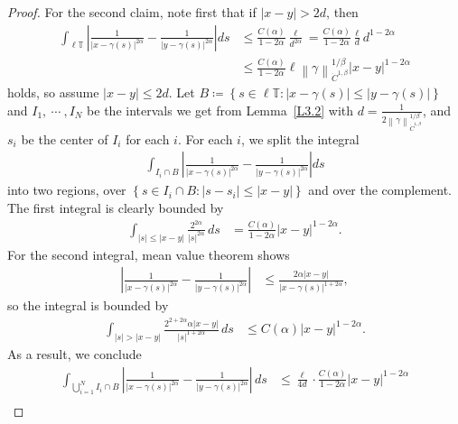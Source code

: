 \documentclass[reqno,centertags,12pt]{amsart}
\theoremstyle{definition}
\numberwithin{equation}{section}
\newcommand{\abs}[1]{\left\lvert#1\right\rvert}
\newcommand{\norm}[1]{\left\|#1\right\|}
\newcommand{\setbc}[2]{\left\{ #1\colon#2 \right\}}
\newcommand{\bbT}{{\mathbb{T}}}
\begin{document}
\begin{proof}
    For the second claim, note first that if $\abs{x - y} > 2d$, then
    \begin{align*}
        \int_{\ell\bbT}\abs{\frac{1}{\abs{x - \gamma(s)}^{2\alpha}}
        - \frac{1}{\abs{y - \gamma(s)}^{2\alpha}}}ds
        &\leq \frac{C(\alpha)}{1-2\alpha}\frac{\ell}{d^{2\alpha}}
        = \frac{C(\alpha)}{1 - 2\alpha}\frac{\ell}{d}d^{1-2\alpha} \\
        &\leq \frac{C(\alpha)}{1-2\alpha}
        \ell\norm{\gamma}_{\dot{C}^{1,\beta}}^{1/\beta}\abs{x-y}^{1-2\alpha}
    \end{align*}
    holds, so assume $\abs{x - y} \leq 2d$.
    Let $B\coloneqq\setbc{s\in\ell\bbT}{\abs{x - \gamma(s)}\leq\abs{y - \gamma(s)}}$ and
    $I_{1},\ \cdots\ ,I_{N}$ be the intervals we get from
    Lemma~\ref{L3.2} with
    $d = \frac{1}{2\norm{\gamma}_{\dot{C}^{1,\beta}}^{1/\beta}}$,
    and $s_{i}$ be the center of $I_{i}$ for each $i$. For each $i$, we split the integral
    \begin{align*}
        \int_{I_{i}\cap B}\abs{
            \frac{1}{\abs{x - \gamma(s)}^{2\alpha}}
            - \frac{1}{\abs{y - \gamma(s)}^{2\alpha}}
        }ds
    \end{align*}
    into two regions, over $\setbc{s\in I_{i}\cap B}{\abs{s - s_{i}}\leq \abs{x-y}}$
    and over the complement. The first integral is clearly bounded by
    \begin{align*}
        \int_{\abs{s}\leq\abs{x - y}}\frac{2^{2\alpha}}{\abs{s}^{2\alpha}}\,ds
        &= \frac{C(\alpha)}{1-2\alpha}\abs{x-y}^{1-2\alpha}.
    \end{align*}
    For the second integral, mean value theorem shows
    \begin{align*}
        \abs{
            \frac{1}{\abs{x - \gamma(s)}^{2\alpha}}
            - \frac{1}{\abs{y - \gamma(s)}^{2\alpha}}
        }
        &\leq \frac{2\alpha\abs{x - y}}{\abs{x - \gamma(s)}^{1+2\alpha}},
    \end{align*}
    so the integral is bounded by
    \begin{align*}
        \int_{\abs{s}>\abs{x-y}}\frac{2^{2+2\alpha}\alpha\abs{x-y}}{\abs{s}^{1+2\alpha}}\,ds
        &\leq C(\alpha)\abs{x - y}^{1-2\alpha}.
    \end{align*}
    As a result, we conclude
    \begin{align*}
        \int_{\bigcup_{i=1}^{N}I_{i}\cap B}
        \abs{
            \frac{1}{\abs{x - \gamma(s)}^{2\alpha}}
            - \frac{1}{\abs{y - \gamma(s)}^{2\alpha}}
        }\,ds
        &\leq \frac{\ell}{4d}\cdot \frac{C(\alpha)}{1-2\alpha}\abs{x - y}^{1-2\alpha} \\

\end{align*}
\end{proof}
\end{document}
